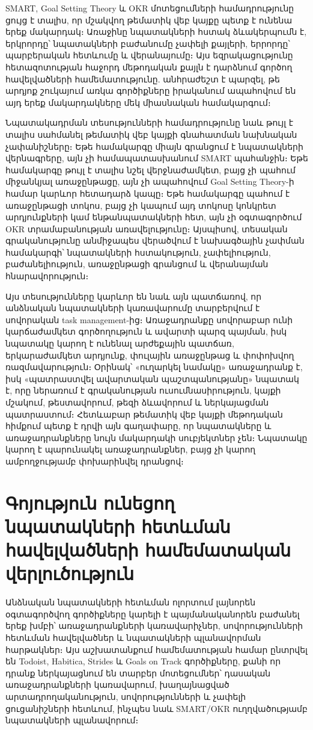 SMART, Goal Setting Theory և OKR մոտեցումների համադրությունը ցույց է տալիս, որ մշակվող թեմատիկ վեբ կայքը պետք է ունենա երեք մակարդակ։ Առաջինը նպատակների հստակ ձևակերպումն է, երկրորդը՝ նպատակների բաժանումը չափելի քայլերի, երրորդը՝ պարբերական հետևումը և վերանայումը։ Այս եզրակացությունը հետազոտության հաջորդ մեթոդական քայլն է դարձնում գործող հավելվածների համեմատությունը. անհրաժեշտ է պարզել, թե արդյոք շուկայում առկա գործիքները իրականում ապահովում են այդ երեք մակարդակները մեկ միասնական համակարգում։

Նպատակադրման տեսությունների համադրությունը նաև թույլ է տալիս սահմանել թեմատիկ վեբ կայքի գնահատման նախնական չափանիշները։ Եթե համակարգը միայն գրանցում է նպատակների վերնագրերը, այն չի համապատասխանում SMART պահանջին։ Եթե համակարգը թույլ է տալիս նշել վերջնաժամկետ, բայց չի պահում միջանկյալ առաջընթացը, այն չի ապահովում Goal Setting Theory-ի համար կարևոր հետադարձ կապը։ Եթե համակարգը պահում է առաջընթացի տոկոս, բայց չի կապում այդ տոկոսը կոնկրետ արդյունքների կամ ենթանպատակների հետ, այն չի օգտագործում OKR տրամաբանության առավելությունը։ Այսպիսով, տեսական գրականությունը անմիջապես վերածվում է նախագծային չափման համակարգի՝ նպատակների հստակություն, չափելիություն, բաժանելիություն, առաջընթացի գրանցում և վերանայման հնարավորություն։

Այս տեսությունները կարևոր են նաև այն պատճառով, որ անձնական նպատակների կառավարումը տարբերվում է սովորական task management-ից։ Առաջադրանքը սովորաբար ունի կարճաժամկետ գործողություն և ավարտի պարզ պայման, իսկ նպատակը կարող է ունենալ արժեքային պատճառ, երկարաժամկետ արդյունք, փուլային առաջընթաց և փոփոխվող ռազմավարություն։ Օրինակ՝ «ուղարկել նամակը» առաջադրանք է, իսկ «պատրաստվել ավարտական պաշտպանությանը» նպատակ է, որը ներառում է գրականության ուսումնասիրություն, կայքի մշակում, թեստավորում, թեզի ձևավորում և ներկայացման պատրաստում։ Հետևաբար թեմատիկ վեբ կայքի մեթոդական հիմքում պետք է դրվի այն գաղափարը, որ նպատակները և առաջադրանքները նույն մակարդակի սուբյեկտներ չեն։ Նպատակը կարող է պարունակել առաջադրանքներ, բայց չի կարող ամբողջությամբ փոխարինվել դրանցով։

\section{Գոյություն ունեցող նպատակների հետևման հավելվածների համեմատական վերլուծություն}

Անձնական նպատակների հետևման ոլորտում լայնորեն օգտագործվող գործիքները կարելի է պայմանականորեն բաժանել երեք խմբի՝ առաջադրանքների կառավարիչներ, սովորությունների հետևման հավելվածներ և նպատակների պլանավորման հարթակներ։ Այս աշխատանքում համեմատության համար ընտրվել են Todoist, Habitica, Strides և Goals on Track գործիքները, քանի որ դրանք ներկայացնում են տարբեր մոտեցումներ՝ դասական առաջադրանքների կառավարում, խաղայնացված արտադրողականություն, սովորությունների և չափելի ցուցանիշների հետևում, ինչպես նաև SMART/OKR ուղղվածությամբ նպատակների պլանավորում։

